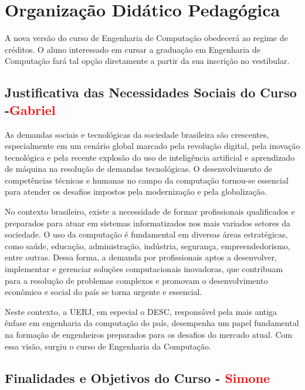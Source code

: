 
\chapter{Organização Didático Pedagógica}

A nova versão do curso de Engenharia de Computação obedecerá ao regime de créditos. O aluno interessado em cursar a graduação em Engenharia de Computação fará tal opção diretamente a partir da sua inscrição no vestibular.




\section{Justificativa das Necessidades Sociais do Curso -\textcolor{red}{Gabriel}}

As demandas sociais e tecnológicas da sociedade brasileira são crescentes, especialmente em um cenário global marcado pela revolução digital, pela inovação tecnológica e pela recente explosão do uso de inteligência artificial e aprendizado de máquina na resolução de demandas tecnológicas. O desenvolvimento de competências técnicas e humanas no campo da computação tornou-se essencial para atender os desafios impostos pela modernização e pela globalização.

No contexto brasileiro, existe a necessidade de formar profissionais qualificados e preparados para atuar em sistemas informatizados nos mais variados setores da sociedade. O uso da computação é fundamental em diversas áreas estratégicas, como saúde, educação, administração, indústria, segurança, empreendedorismo, entre outras. Dessa forma, a demanda por profissionais aptos a desenvolver, implementar e gerenciar soluções computacionais inovadoras, que contribuam para a resolução de problemas complexos e promovam o desenvolvimento econômico e social do país se torna urgente e essencial.

Neste contexto, a UERJ, em especial o DESC, responsável pela mais antiga ênfase em engenharia da computação do país, desempenha um papel fundamental na formação de engenheiros preparados para os desafios do mercado atual. Com essa visão, surgiu o curso de Engenharia da Computação.

\section{Finalidades e Objetivos do Curso - \textcolor{red}{Simone}}

